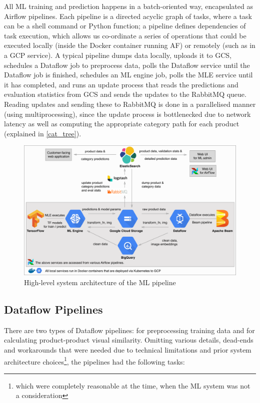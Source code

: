All ML training and prediction happens in a batch-oriented way, encapsulated as Airflow pipelines.
Each pipeline is a directed acyclic graph of tasks, where a task can be a shell command or Python function; a pipeline defines dependencies of task execution, which allows us co-ordinate a series of operations that could be executed locally (inside the Docker container running AF) or remotely (such as in a GCP service).
A typical pipeline dumps data locally, uploads it to GCS, schedules a Dataflow job to preprocess data, polls the Dataflow service until the Dataflow job is finished, schedules an ML engine job, polls the MLE service until it has completed, and runs an update process that reads the predictions and evaluation statistics from GCS and sends the updates to the RabbitMQ queue.
Reading updates and sending these to RabbitMQ is done in a parallelised manner (using multiprocessing), since the update process is bottlenecked due to network latency as well as computing the appropriate category path for each product (explained in \ref{cat_tree}).

\begin{figure}
  \hspace*{-0.2\textwidth}
  \includegraphics[width=1.4\textwidth]{diagrams/architecture}
  \caption{High-level system architecture of the ML pipeline}
  \label{arch_diagram}
\end{figure}

\subsection{Dataflow Pipelines}
There are two types of Dataflow pipelines: for preprocessing training data and for calculating product-product visual similarity. Omitting various details, dead-ends and workarounds that were needed due to technical limitations and prior system architecture choices\footnote{which were completely reasonable at the time, when the ML system was not a consideration}, the pipelines had the following tasks:

